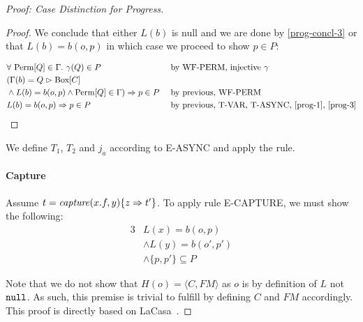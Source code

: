\begin{proof}[Proof: Case Distinction for Progress]
\begin{proof}
We conclude that either $L(b)$ is null and we are done by \cref{prog-concl-3} or that $L(b) = b(o,p)$ in which case we proceed to show $p \in P$:

\begin{alignat}{2}
        &\forall \text{ Perm}[Q] \in \Gamma.\ \gamma(Q) \in P && \text{ by WF-PERM, injective $\gamma$}\\
        \nonumber&(\Gamma(b) = Q \vartriangleright \text{Box}[C]\\
        &\wedge L(b) = b(o, p) \wedge \text{Perm}[Q] \in \Gamma) \Rightarrow p \in P && \text{ by previous, WF-PERM}\\
        &L(b) = b(o,p) \Rightarrow p \in P && \text{ by previous, T-VAR, T-ASYNC, \cref{prog-1}, \cref{prog-3}}
\end{alignat}
\end{proof}

We define $T_1$, $T_2$ and $j_a$ according to E-ASYNC and apply the rule.

\paragraph{Capture}
Assume $t = \mathop{\mathit{capture}}(x.f, y)\{ z \Rightarrow t' \}$. To apply rule E-CAPTURE, we must show the following:
\begin{alignat}{3}
    & L(x) = b(o,p) \label{prog-capt-c1}\\
    & \wedge L(y) = b(o',p') \label{prog-capt-c2}\\
    & \wedge \{p, p'\} \subseteq P \label{prog-capt-c3}
\end{alignat}

Note that we do not show that $H(o) = \langle C, FM \rangle$ as $o$ is by definition of $L$ not $\texttt{null}$. As such, this premise is trivial to fulfill by defining $C$ and $FM$ accordingly. This proof is directly based on LaCasa~\cite{haller_lacasa_2016}.


\end{proof}
